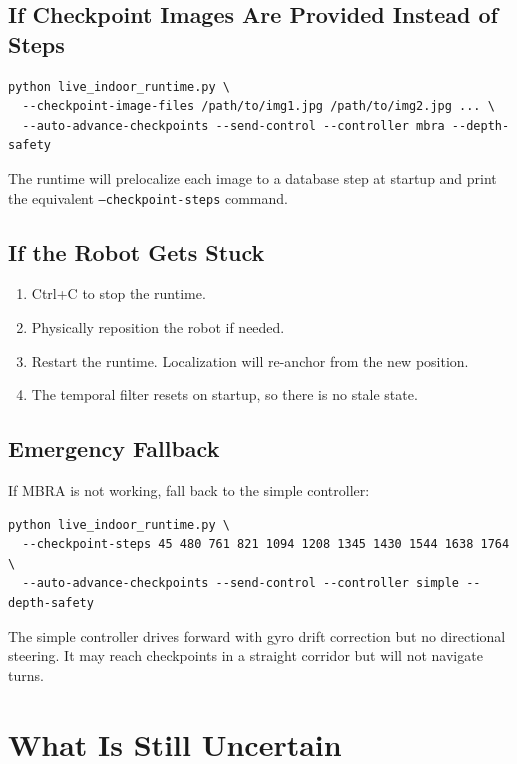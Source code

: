 \documentclass[11pt]{article}
\begin{document}
\subsection{If Checkpoint Images Are Provided Instead of Steps}
\begin{lstlisting}
python live_indoor_runtime.py \
  --checkpoint-image-files /path/to/img1.jpg /path/to/img2.jpg ... \
  --auto-advance-checkpoints --send-control --controller mbra --depth-safety
\end{lstlisting}
The runtime will prelocalize each image to a database step at startup and print the equivalent \texttt{--checkpoint-steps} command.

\subsection{If the Robot Gets Stuck}
\begin{enumerate}
\item Ctrl+C to stop the runtime.
\item Physically reposition the robot if needed.
\item Restart the runtime. Localization will re-anchor from the new position.
\item The temporal filter resets on startup, so there is no stale state.
\end{enumerate}

\subsection{Emergency Fallback}
If MBRA is not working, fall back to the simple controller:
\begin{lstlisting}
python live_indoor_runtime.py \
  --checkpoint-steps 45 480 761 821 1094 1208 1345 1430 1544 1638 1764 \
  --auto-advance-checkpoints --send-control --controller simple --depth-safety
\end{lstlisting}
The simple controller drives forward with gyro drift correction but no directional steering. It may reach checkpoints in a straight corridor but will not navigate turns.


\section{What Is Still Uncertain}
\end{document}
